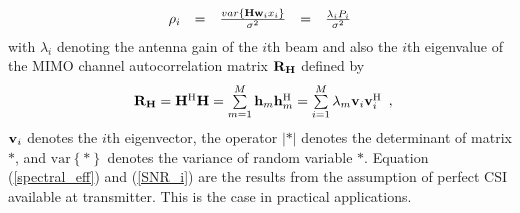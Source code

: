 \documentclass[10pt,fleqn, twocolumn]{IEEEtran}
\newcommand{\bh}{{\bf h}}
\newcommand{\bH}{{\bf H}}
\newcommand{\bv}{{\bf v}}
\newcommand{\bw}{{\bf w}}
\newcommand{\bR}{{\bf R}}
\begin{document}
\begin{equation}
\begin{array}{rcccl}
\rho_{i}&=&\frac{\mbox{var}\left\{\bH\bw_{i}x_{i}\right\}}{\sigma^2}&=&\frac{\lambda_{i}P_{i}}{\sigma^2}
\end{array}\label{SNR_i}
\end{equation}
\noindent with $\lambda_{i}$ denoting the antenna gain of the
$i$th beam and also the $i$th eigenvalue of the MIMO channel
autocorrelation matrix $\bR_{\bH}$ defined by
\begin{equation}
\begin{array}{l}
\bR_{\bH}=\bH^{\rm H}\bH=\sum\limits_{m=1}^{M}\bh_{m}\bh_{m}^{\rm
H}=\sum\limits_{i=1}^{M}\lambda_{m}\bv_{i}\bv_{i}^{\rm H}
\end{array},\label{R_h}
\end{equation}
\noindent $\bv_{i}$ denotes the $i$th eigenvector, the operator
$\left|\ast\right|$ denotes the determinant of matrix $\ast$, and
$\mbox{var}\left\{\ast\right\}$ denotes the variance of random
variable $\ast$. Equation (\ref{spectral_eff}) and (\ref{SNR_i})
are the results from the assumption of perfect CSI available at
transmitter. This is the case in practical applications.
\end{document}
